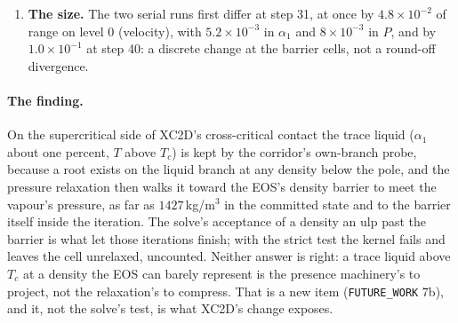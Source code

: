 \documentclass[11pt,a4paper]{article}
\newcommand{\code}[1]{\texttt{\small #1}}
\begin{document}
\begin{enumerate}[nosep]
      twenty cells differ by more than $10^{-3}$ of range, in two
      clusters on the contact ((23--25, 103--105) and (51--53, 75--77)
      and their mirror); the worst, (76, 52), holds
      $\alpha_1 = 0.0092$, $\rho_1 = 848$, $\rho_2 = 91$\,kg/m$^3$,
      $T = 364.6$\,K, $P = 5.31$\,MPa in the run that relaxed it at the
      barrier and $\alpha_1 = 0.0144$, $\rho_1 = 552$, $T = 361.0$\,K,
      $P = 5.27$\,MPa, $u$ lower by $0.39$\,m/s in the run that left it
      unrelaxed.  Every trace-liquid cell of the run (189 at step 31, 334
      at step 40, $10^{-4} < \alpha_1 < 0.05$) is above $T_c$; their
      liquid sits at $989$\,kg/m$^3$, the left state's density, and by
      step 40 thirty one of them in both runs carry a liquid above
      $1000$\,kg/m$^3$, up to $1427$: the walk compresses the trace toward
      the pole whether or not the barrier is reached.  The stage
      projection leaves a failed cell unchanged and does not count the
      failure (\code{PS\_relax.H}), so no counter saw it; the kernel's
      reason is \code{PSR\_BAD\_EOS} by the code path, not by a count.
\item \textbf{The size.}  The two serial runs first differ at step 31,
      at once by $4.8\times10^{-2}$ of range on level 0 (velocity), with
      $5.2\times10^{-3}$ in $\alpha_1$ and $8\times10^{-3}$ in $P$, and
      by $1.0\times10^{-1}$ at step 40: a discrete change at the barrier
      cells, not a round-off divergence.
\end{enumerate}

\paragraph{The finding.}  On the supercritical side of XC2D's
cross-critical contact the trace liquid ($\alpha_1$ about one percent,
$T$ above $T_c$) is kept by the corridor's own-branch probe, because a
root exists on the liquid branch at any density below the pole, and the
pressure relaxation then walks it toward the EOS's density barrier to
meet the vapour's pressure, as far as $1427$\,kg/m$^3$ in the committed
state and to the barrier itself inside the iteration.  The solve's
acceptance of a density an ulp past the barrier is what let those
iterations finish; with the strict test the kernel fails and leaves the
cell unrelaxed, uncounted.  Neither answer is right: a trace liquid
above $T_c$ at a density the EOS can barely represent is the presence
machinery's to project, not the relaxation's to compress.  That is a
new item (\code{FUTURE\_WORK} 7b), and it, not the solve's test, is
what XC2D's change exposes.
\end{document}
